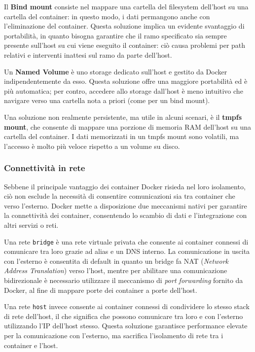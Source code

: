 Il \textbf{Bind mount} consiste nel mappare una cartella del filesystem dell'host su una cartella del container: in questo modo, i dati permangono anche con l'eliminazione del container. Questa soluzione implica un evidente svantaggio di portabilità, in quanto bisogna garantire che il ramo specificato sia sempre presente sull'host su cui viene eseguito il container: ciò causa problemi per path relativi e interventi inattesi sul ramo da parte dell'host.

Un \textbf{Named Volume} è uno storage dedicato sull'host e gestito da Docker indipendentemente da esso. Questa soluzione offre una maggiore portabilità ed è più automatica; per contro, accedere allo storage dall'host è meno intuitivo che navigare verso una cartella nota a priori (come per un bind mount).

Una soluzione non realmente persistente, ma utile in alcuni scenari, è il \textbf{tmpfs mount}, che consente di mappare una porzione di memoria RAM dell'host su una cartella del container. I dati memorizzati in un tmpfs mount sono volatili, ma l'accesso è molto più veloce rispetto a un volume su disco.

\subsubsection{Connettività in rete}
Sebbene il principale vantaggio dei container Docker risieda nel loro isolamento, ciò non esclude la necessità di consentire comunicazioni sia tra container che verso l’esterno. Docker mette a disposizione due meccanismi nativi per garantire la connettività dei container, consentendo lo scambio di dati e l’integrazione con altri servizi o reti.

Una rete \texttt{bridge} è una rete virtuale privata che consente ai container connessi di comunicare tra loro grazie ad alias e un DNS interno. La comunicazione in uscita con l'esterno è consentita di default in quanto un bridge fa NAT (\emph{Network Address Translation}) verso l'host, mentre per abilitare una comunicazione bidirezionale è necessario utilizzare il meccanismo di \emph{port forwarding} fornito da Docker, al fine di mappare porte dei container a porte dell'host.

Una rete \texttt{host} invece consente ai container connessi di condividere lo stesso stack di rete dell'host, il che significa che possono comunicare tra loro e con l'esterno utilizzando l'IP dell'host stesso. Questa soluzione garantisce performance elevate per la comunicazione con l'esterno, ma sacrifica l'isolamento di rete tra i container e l'host.

